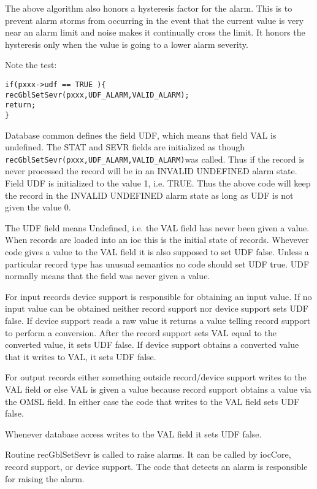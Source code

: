 The above algorithm also honors a hysteresis factor for the alarm. This is to prevent alarm storms from occurring in the 
event that the current value is very near an alarm limit and noise makes it continually cross the limit. It honors the 
hysteresis only when the value is going to a lower alarm severity.

Note the test:

\begin{verbatim}if(pxxx->udf == TRUE ){
recGblSetSevr(pxxx,UDF_ALARM,VALID_ALARM);
return;
}
\end{verbatim}Database common defines the field UDF, which means that field VAL is undefined. The STAT and SEVR fields are 
initialized as though \verb|recGblSetSevr(pxxx,UDF_ALARM,VALID_ALARM)|was called. Thus if the record is never 
processed the record will be in an INVALID UNDEFINED alarm state. Field UDF is initialized to the value 1, i.e. TRUE. 
Thus the above code will keep the record in the INVALID UNDEFINED alarm state as long as UDF is not given the 
value 0.

The UDF field means Undefined, i.e. the VAL field has never been given a value. When records are loaded into an ioc this 
is the initial state of records. Whevever code gives a value to the VAL field it is also supposed to set UDF false. Unless a 
particular record type has unusual semantics no code should set UDF true. UDF normally means that the field was never 
given a value.

For input records device support is responsible for obtaining an input value. If no input value can be obtained neither 
record support nor device support sets UDF false. If device support reads a raw value it returns a value telling record 
support to perform a conversion. After the record support sets VAL equal to the converted value, it sets UDF false. If 
device support obtains a converted value that it writes to VAL, it sets UDF false.

For output records either something outside record/device support writes to the VAL field or else VAL is given a value 
because record support obtains a value via the OMSL field. In either case the code that writes to the VAL field sets UDF 
false.

Whenever database access writes to the VAL field it sets UDF false.

Routine recGblSetSevr is called to raise alarms. It can be called by iocCore, record support, or device support. The code 
that detects an alarm is responsible for raising the alarm.

